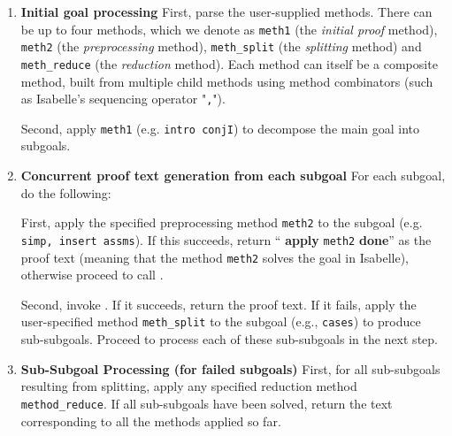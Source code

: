 \documentclass[10pt,conference]{IEEEtran}
\newcommand{\isakw}[1]{{\bfseries\ttfamily\def\isachardot{.}\def\isacharunderscore{\isacharunderscorekeyword}%
\def\isacharbraceleft{\{}\def\isacharbraceright{\}}#1}}
\renewcommand{\isacommand}[1]{\textcolor{IsaBlue}{\isakw{#1}}}
\begin{document}
\begin{enumerate}
    \item \textbf{Initial goal processing}
        First, parse the user-supplied methods. There can be up to four methods, which we denote as \texttt{meth1} (the \emph{initial proof} method), \texttt{meth2} (the \emph{preprocessing} method), \texttt{meth\_split} (the \emph{splitting} method) and \texttt{meth\_reduce} (the \emph{reduction} method).  Each method can itself be a composite method, built from multiple child methods using method combinators (such as Isabelle's sequencing operator "\texttt{,}").
        
        Second, apply \texttt{meth1} (e.g. \texttt{intro~conjI}) to decompose the main goal into subgoals.

    \item \textbf{Concurrent proof text generation from each subgoal}
        For each subgoal, do the following:
        
             First, apply the specified preprocessing method \texttt{meth2} to the subgoal (e.g. \texttt{simp, insert~assms}). If this succeeds, return ``\isacommand{apply} \texttt{meth2} \isacommand{done}'' as the proof text (meaning that the method \texttt{meth2} solves the goal in Isabelle), otherwise proceed to call \sledgehammer{}.
             
             Second, invoke \sledgehammer{}. {If it succeeds}, return the proof text. {If it fails}, apply the user-specified method \texttt{meth\_split} to the subgoal (e.g., \texttt{cases}) to produce sub-subgoals. Proceed to process each of these sub-subgoals in the next step.

    \item \textbf{Sub-Subgoal Processing (for failed subgoals)}
        First, for all sub-subgoals resulting from splitting, apply any specified reduction method \texttt{method\_reduce}. If all sub-subgoals have been solved, return the text corresponding to all the methods applied so far.
        

\end{enumerate}
\end{document}
